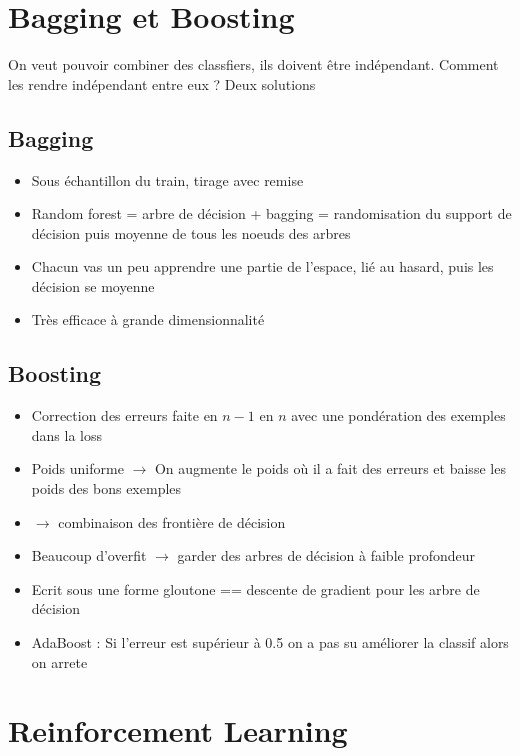 \documentclass{article}
\begin{document}
\section{Bagging et Boosting}
On veut pouvoir combiner des classfiers, ils doivent être indépendant. Comment les rendre indépendant entre eux ? Deux solutions

\subsection{Bagging}
\begin{itemize}
    \item Sous échantillon du train, tirage avec remise
    \item Random forest = arbre de décision + bagging = randomisation du support de décision puis moyenne de tous les noeuds des arbres 
    \item Chacun vas un peu apprendre une partie de l'espace, lié au hasard, puis les décision se moyenne
    \item Très efficace à grande dimensionnalité
\end{itemize}

\subsection{Boosting}
\begin{itemize}
    \item Correction des erreurs faite en $ n-1 $ en $ n $ avec une pondération des exemples dans la loss
    \item Poids uniforme $\rightarrow$ On augmente le poids où il a fait des erreurs et baisse les poids des bons exemples
    \item $\rightarrow$ combinaison des frontière de décision
    \item Beaucoup d'overfit $\rightarrow$ garder des arbres de décision à faible profondeur
    \item Ecrit sous une forme gloutone == descente de gradient pour les arbre de décision 
    \item AdaBoost : Si l'erreur est supérieur à 0.5 on a pas su améliorer la classif alors on arrete
\end{itemize}


\section{Reinforcement Learning}
\end{document}
